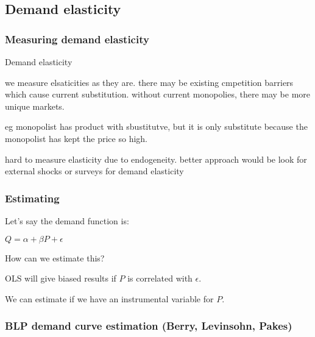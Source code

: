 
\subsection{Demand elasticity}

\subsubsection{Measuring demand elasticity}

Demand elasticity

we measure elsaticities as they are. there may be existing cmpetition barriers which cause current substitution. without current monopolies, there may be more unique markets.

eg monopolist has product with sbustitutve, but it is only substitute because the monopolist has kept the price so high.

hard to measure elasticity due to endogeneity. better approach would be look for external shocks or surveys for demand elasticity

\subsubsection{Estimating}

Let's say the demand function is:

\(Q=\alpha+\beta P + \epsilon \)

How can we estimate this?

OLS will give biased results if \(P\) is correlated with \(\epsilon \).

We can estimate if we have an instrumental variable for \(P\). 

\subsubsection{BLP demand curve estimation (Berry, Levinsohn, Pakes)}

